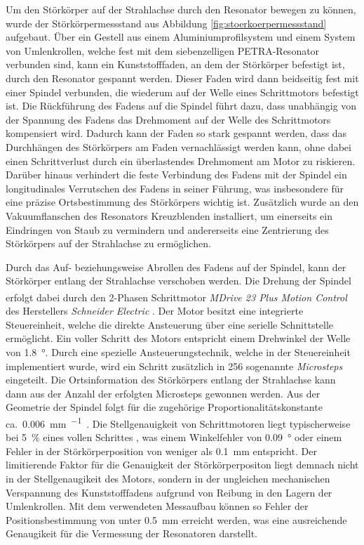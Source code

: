 Um den Störkörper auf der Strahlachse durch den Resonator bewegen zu können, wurde der Störkörpermessstand aus Abbildung \ref{fig:stoerkoerpermessstand} aufgebaut.
Über ein Gestell aus einem Aluminiumprofilsystem und einem System von Umlenkrollen, welche fest mit dem siebenzelligen PETRA-Resonator verbunden sind, kann ein Kunststofffaden, an dem der Störkörper befestigt ist, durch den Resonator gespannt werden.
Dieser Faden wird dann beidseitig fest mit einer Spindel verbunden, die wiederum auf der Welle eines Schrittmotors befestigt ist.
Die Rückführung des Fadens auf die Spindel führt dazu, dass unabhängig von der Spannung des Fadens das Drehmoment auf der Welle des Schrittmotors kompensiert wird.
Dadurch kann der Faden so stark gespannt werden, dass das Durchhängen des Störkörpers am Faden vernachlässigt werden kann, ohne dabei einen Schrittverlust durch ein überlastendes Drehmoment am Motor zu riskieren.
Darüber hinaus verhindert die feste Verbindung des Fadens mit der Spindel ein longitudinales Verrutschen des Fadens in seiner Führung, was insbesondere für eine präzise Ortsbestimmung des Störkörpers wichtig ist.
Zusätzlich wurde an den Vakuumflanschen des Resonators Kreuzblenden installiert, um einerseits ein Eindringen von Staub zu vermindern und andererseits eine Zentrierung des Störkörpers auf der Strahlachse zu ermöglichen.

Durch das Auf- beziehungsweise Abrollen des Fadens auf der Spindel, kann der Störkörper entlang der Strahlachse verschoben werden.
Die Drehung der Spindel erfolgt dabei durch den 2-Phasen Schrittmotor \textit{MDrive\textsuperscript{\textregistered} 23 Plus Motion Control} des Herstellers \textit{Schneider Electric} \cite{motor_datasheet}.
Der Motor besitzt eine integrierte Steuereinheit, welche die direkte Ansteuerung über eine serielle Schnittstelle ermöglicht.
Ein voller Schritt des Motors entspricht einem Drehwinkel der Welle von \SI{1.8}{\degree}.
Durch eine spezielle Ansteuerungstechnik, welche in der Steuereinheit implementiert wurde, wird ein Schritt zusätzlich in \num{256} sogenannte \textit{Microsteps} eingeteilt.
Die Ortsinformation des Störkörpers entlang der Strahlachse kann dann aus der Anzahl der erfolgten Microsteps gewonnen werden.
Aus der Geometrie der Spindel folgt für die zugehörige Proportionalitätskonstante ca.\ \SI{0.006}{\milli\metre\per\micro\step}.
Die Stellgenauigkeit von Schrittmotoren liegt typischerweise bei \SI{5}{\percent} eines vollen Schrittes \cite{gecko}, was einem Winkelfehler von \SI{0.09}{\degree} oder einem Fehler in der Störkörperposition von weniger als \SI{0.1}{\milli\metre} entspricht.
Der limitierende Faktor für die Genauigkeit der Störkörperpositon liegt demnach nicht in der Stellgenaugikeit des Motors, sondern in der ungleichen mechanischen Verspannung des Kunststofffadens aufgrund von Reibung in den Lagern der Umlenkrollen.
Mit dem verwendeten Messaufbau können so Fehler der Positionsbestimmung von unter \SI{0.5}{mm} erreicht werden, was eine ausreichende Genaugikeit für die Vermessung der Resonatoren darstellt.

